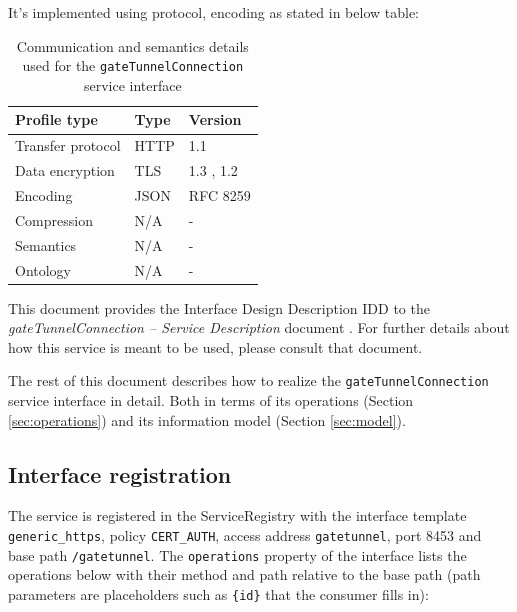 \documentclass[a4paper]{arrowhead}
\begin{document}
It's implemented using protocol, encoding as stated in below table:
\begin{table}[ht!]
  \centering
  \begin{tabular}{|l|l|l|}
    \hline
    \rowcolor{gray!33} Profile type & Type & Version \\ \hline
    Transfer protocol & HTTP & 1.1 \cite{rfc9112} \\ \hline
    Data encryption & TLS & 1.3 \cite{rfc8446}, 1.2 \cite{rfc5246} \\ \hline
    Encoding & JSON & RFC 8259 \cite{rfc8259} \\ \hline
    Compression & N/A & - \\ \hline
    Semantics & N/A & - \\ \hline
    Ontology & N/A & - \\ \hline
  \end{tabular}
  \caption{Communication and semantics details used for the \texttt{gate\allowbreak{}Tunnel\allowbreak{}Connection} service interface}
  \label{tab:comunication_semantics_profile}
\end{table}

This document provides the Interface Design Description IDD to the \textit{gateTunnelConnection -- Service Description} document \cite{gt-gateTunnelConnection-sd}.
For further details about how this service is meant to be used, please consult that document.

The rest of this document describes how to realize the \texttt{gate\allowbreak{}Tunnel\allowbreak{}Connection} service
interface in detail. Both in terms of its operations (Section \ref{sec:operations}) and its information model (Section \ref{sec:model}).

\subsection{Interface registration}

The service is registered in the ServiceRegistry with the interface template \texttt{generic\_\allowbreak{}https}, policy \texttt{CERT\_\allowbreak{}AUTH}, access address \texttt{gatetunnel}, port 8453 and base path \texttt{/\allowbreak{}gatetunnel}. The \texttt{operations} property of the interface lists the operations below with their method and path relative to the base path (path parameters are placeholders such as \texttt{\{id\}} that the consumer fills in):
\end{document}
